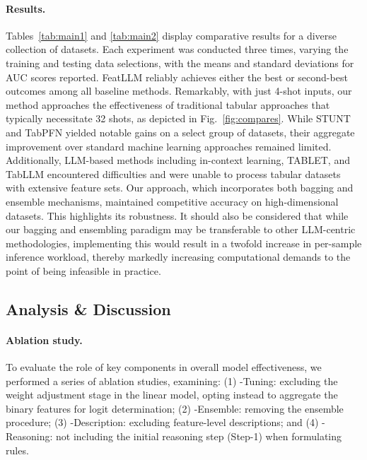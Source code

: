 \vspace*{-0.12in}
\paragraph{Results.}
Tables~\ref{tab:main1} and \ref{tab:main2} display comparative results for a diverse collection of datasets. Each experiment was conducted three times, varying the training and testing data selections, with the means and standard deviations for AUC scores reported. \textsf{FeatLLM} reliably achieves either the best or second-best outcomes among all baseline methods. Remarkably, with just 4-shot inputs, our method approaches the effectiveness of traditional tabular approaches that typically necessitate 32 shots, as depicted in Fig.~\ref{fig:compares}. While STUNT and TabPFN yielded notable gains on a select group of datasets, their aggregate improvement over standard machine learning approaches remained limited. Additionally, LLM-based methods including in-context learning, TABLET, and TabLLM encountered difficulties and were unable to process tabular datasets with extensive feature sets. Our approach, which incorporates both bagging and ensemble mechanisms, maintained competitive accuracy on high-dimensional datasets. This highlights its robustness. It should also be considered that while our bagging and ensembling paradigm may be transferable to other LLM-centric methodologies, implementing this would result in a twofold increase in per-sample inference workload, thereby markedly increasing computational demands to the point of being infeasible in practice.

\subsection{Analysis \& Discussion}
\label{sec:analysis}
\paragraph{Ablation study.} To evaluate the role of key components in overall model effectiveness, we performed a series of ablation studies, examining: (1) \textsf{-Tuning}: excluding the weight adjustment stage in the linear model, opting instead to aggregate the binary features for logit determination; (2) \textsf{-Ensemble}: removing the ensemble procedure; (3) \textsf{-Description}: excluding feature-level descriptions; and (4) \textsf{-Reasoning}: not including the initial reasoning step (Step-1) when formulating rules.

